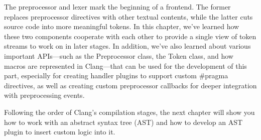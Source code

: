 The preprocessor and lexer mark the beginning of a frontend. The former replaces preprocessor directives with other textual contents, while the latter cuts source code into more meaningful tokens. In this chapter, we've learned how these two components cooperate with each other to provide a single view of token streams to work on in later stages. In addition, we've also learned about various important APIs—such as the Preprocessor class, the Token class, and how macros are represented in Clang—that can be used for the development of this part, especially for creating handler plugins to support custom \#pragma directives, as well as creating custom preprocessor callbacks for deeper integration with preprocessing events.

Following the order of Clang's compilation stages, the next chapter will show you how to work with an abstract syntax tree (AST) and how to develop an AST plugin to insert custom logic into it.